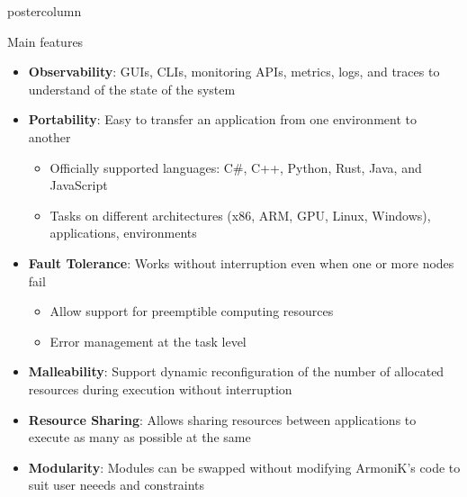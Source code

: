 \begin{frame}[fragile]
\begin{columns}[T]
\begin{column}{.49\textwidth}
\begin{beamercolorbox}[center,wd=\textwidth]{postercolumn}
\begin{minipage}[T]{.96\textwidth}
            \begin{block}{Main features}
                \begin{itemize}
                \item \textbf{Observability}: GUIs, CLIs, monitoring APIs, metrics, logs, and traces to understand of the state of the system
                \item \textbf{Portability}: Easy to transfer an application from one environment to another
                \begin{itemize}
                    \item Officially supported languages: C\#, C++, Python, Rust, Java, and JavaScript
                    \item Tasks on different architectures (x86, ARM, GPU, Linux, Windows), applications, environments
                \end{itemize}
                \item \textbf{Fault Tolerance}: Works without interruption even when one or more nodes fail
                \begin{itemize}
                    \item Allow support for preemptible computing resources
                    \item Error management at the task level
                \end{itemize}
                \item \textbf{Malleability}: Support dynamic reconfiguration of the number of allocated resources during execution without interruption
                \item \textbf{Resource Sharing}: Allows sharing resources between applications to execute as many as possible at the same
                \item \textbf{Modularity}: Modules can be swapped without modifying ArmoniK's code to suit user neeeds and constraints
                \end{itemize}
            \end{block}


\end{minipage}
\end{beamercolorbox}
\end{column}
\end{columns}
\end{frame}
